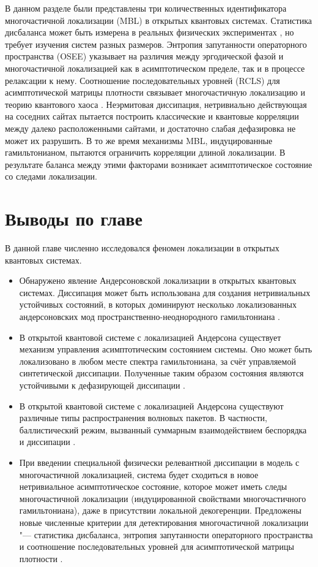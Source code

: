 В данном разделе были представлены три количественных идентификатора многочастичной локализации (MBL) в открытых квантовых системах.
Статистика дисбаланса может быть измерена в реальных физических экспериментах \cite{Schreiber2015, Choi2016, Bordia2017, Lschen2017}, но требует изучения систем разных размеров. 
Энтропия запутанности операторного пространства (OSEE) указывает на различия между эргодической фазой и многочастичной локализацией как в асимптотическом пределе, так и в процессе релаксации к нему.
Соотношение последовательных уровней (RCLS) для асимптотической матрицы плотности связывает многочастичную локализацию и теорию квантового хаоса \cite{Prosen2013, Haake2018}. 
Неэрмитовая диссипация, нетривиально действующая на соседних сайтах пытается построить классические и квантовые корреляции между далеко расположенными сайтами, и достаточно слабая дефазировка не может их разрушить. 
В то же время механизмы MBL, индуцированные гамильтонианом, пытаются ограничить корреляции длиной локализации. 
В результате баланса между этими факторами возникает асимптотическое состояние со следами локализации.

\section{Выводы по главе}\label{sec:ch2/results}
В данной главе численно исследовался феномен локализации в открытых квантовых системах.
\begin{itemize}[beginpenalty=10000] %
	\item Обнаружено явление Андерсоновской локализации в открытых квантовых системах. Диссипация может быть использована для создания нетривиальных устойчивых состояний, в которых доминируют несколько локализованных андерсоновских мод пространственно-неоднородного гамильтониана \cite{Yusipov2017}.
	\item В открытой квантовой системе с локализацией Андерсона существует механизм управления асимптотическим состоянием системы. Оно может быть локализовано в любом месте спектра гамильтониана, за счёт управляемой синтетической диссипации. Полученные таким образом состояния являются устойчивыми к дефазирующей диссипации \cite{Vershinina2017}.
	\item В открытой квантовой системе с локализацией Андерсона существуют различные типы распространения волновых пакетов. В частности, баллистический режим, вызванный суммарным взаимодействием беспорядка и диссипации \cite{Yusipov2018}. 
	\item При введении специальной физически релевантной диссипации в модель с многочастичной локализацией, система будет сходиться в новое нетривиальное асимптотическое состояние, которое может иметь следы многочастичной локализации (индуцированной свойствами многочастичного гамильтониана), даже в присутствии локальной декогеренции. Предложены новые численные критерии для детектирования многочастичной локализации "--- статистика дисбаланса, энтропия запутанности операторного пространства и соотношение последовательных уровней для асимптотической матрицы плотности \cite{Vakulchyk2018}.
\end{itemize}


